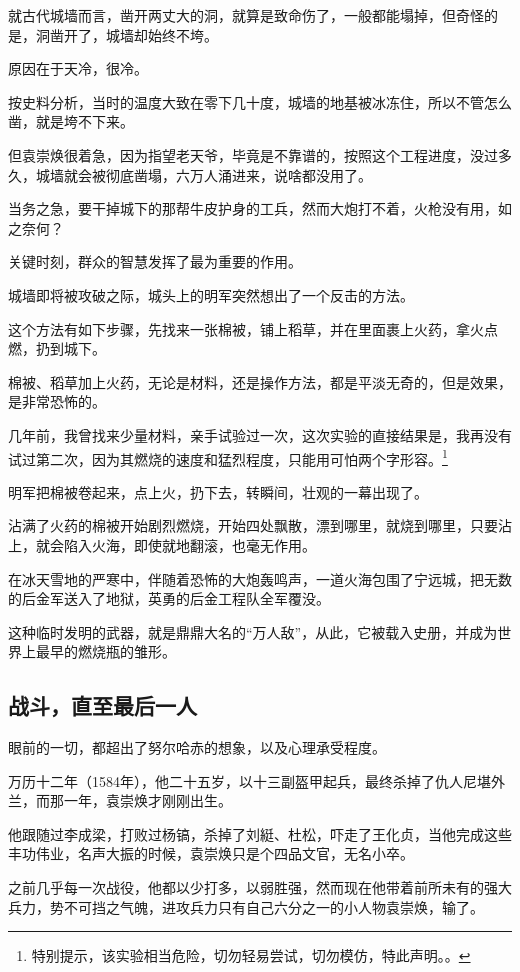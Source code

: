 \begin{multicols}{\theparacolNo}
就古代城墙而言，凿开两丈大的洞，就算是致命伤了，一般都能塌掉，但奇怪的是，洞凿开了，城墙却始终不垮。

原因在于天冷，很冷。

按史料分析，当时的温度大致在零下几十度，城墙的地基被冰冻住，所以不管怎么凿，就是垮不下来。

但袁崇焕很着急，因为指望老天爷，毕竟是不靠谱的，按照这个工程进度，没过多久，城墙就会被彻底凿塌，六万人涌进来，说啥都没用了。

当务之急，要干掉城下的那帮牛皮护身的工兵，然而大炮打不着，火枪没有用，如之奈何？

关键时刻，群众的智慧发挥了最为重要的作用。

城墙即将被攻破之际，城头上的明军突然想出了一个反击的方法。

这个方法有如下步骤，先找来一张棉被，铺上稻草，并在里面裹上火药，拿火点燃，扔到城下。

棉被、稻草加上火药，无论是材料，还是操作方法，都是平淡无奇的，但是效果，是非常恐怖的。

几年前，我曾找来少量材料，亲手试验过一次，这次实验的直接结果是，我再没有试过第二次，因为其燃烧的速度和猛烈程度，只能用可怕两个字形容。\footnote{特别提示，该实验相当危险，切勿轻易尝试，切勿模仿，特此声明。。}

明军把棉被卷起来，点上火，扔下去，转瞬间，壮观的一幕出现了。

沾满了火药的棉被开始剧烈燃烧，开始四处飘散，漂到哪里，就烧到哪里，只要沾上，就会陷入火海，即使就地翻滚，也毫无作用。

在冰天雪地的严寒中，伴随着恐怖的大炮轰鸣声，一道火海包围了宁远城，把无数的后金军送入了地狱，英勇的后金工程队全军覆没。

这种临时发明的武器，就是鼎鼎大名的“万人敌”，从此，它被载入史册，并成为世界上最早的燃烧瓶的雏形。

\subsection{战斗，直至最后一人}
眼前的一切，都超出了努尔哈赤的想象，以及心理承受程度。

万历十二年（1584年），他二十五岁，以十三副盔甲起兵，最终杀掉了仇人尼堪外兰，而那一年，袁崇焕才刚刚出生。

他跟随过李成梁，打败过杨镐，杀掉了刘綎、杜松，吓走了王化贞，当他完成这些丰功伟业，名声大振的时候，袁崇焕只是个四品文官，无名小卒。

之前几乎每一次战役，他都以少打多，以弱胜强，然而现在他带着前所未有的强大兵力，势不可挡之气魄，进攻兵力只有自己六分之一的小人物袁崇焕，输了。


\end{multicols}
